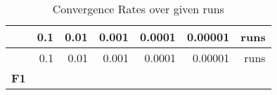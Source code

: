 \documentclass[12pt,a4paper]{article}
\begin{document}
\begin{longtable}[c]{@{}crrrrrr@{}}
\caption{Convergence Rates over given runs}\tabularnewline
\toprule
\begin{minipage}[b]{0.11\columnwidth}\centering\strut
~
\strut\end{minipage} &
\begin{minipage}[b]{0.08\columnwidth}\raggedleft\strut
0.1
\strut\end{minipage} &
\begin{minipage}[b]{0.08\columnwidth}\raggedleft\strut
0.01
\strut\end{minipage} &
\begin{minipage}[b]{0.09\columnwidth}\raggedleft\strut
0.001
\strut\end{minipage} &
\begin{minipage}[b]{0.10\columnwidth}\raggedleft\strut
0.0001
\strut\end{minipage} &
\begin{minipage}[b]{0.11\columnwidth}\raggedleft\strut
0.00001
\strut\end{minipage} &
\begin{minipage}[b]{0.07\columnwidth}\raggedleft\strut
runs
\strut\end{minipage}\tabularnewline
\midrule
\endfirsthead
\toprule
\begin{minipage}[b]{0.11\columnwidth}\centering\strut
~
\strut\end{minipage} &
\begin{minipage}[b]{0.08\columnwidth}\raggedleft\strut
0.1
\strut\end{minipage} &
\begin{minipage}[b]{0.08\columnwidth}\raggedleft\strut
0.01
\strut\end{minipage} &
\begin{minipage}[b]{0.09\columnwidth}\raggedleft\strut
0.001
\strut\end{minipage} &
\begin{minipage}[b]{0.10\columnwidth}\raggedleft\strut
0.0001
\strut\end{minipage} &
\begin{minipage}[b]{0.11\columnwidth}\raggedleft\strut
0.00001
\strut\end{minipage} &
\begin{minipage}[b]{0.07\columnwidth}\raggedleft\strut
runs
\strut\end{minipage}\tabularnewline
\midrule
\endhead
\begin{minipage}[t]{0.11\columnwidth}\centering\strut
\textbf{F1}

\end{minipage}
\end{longtable}
\end{document}
